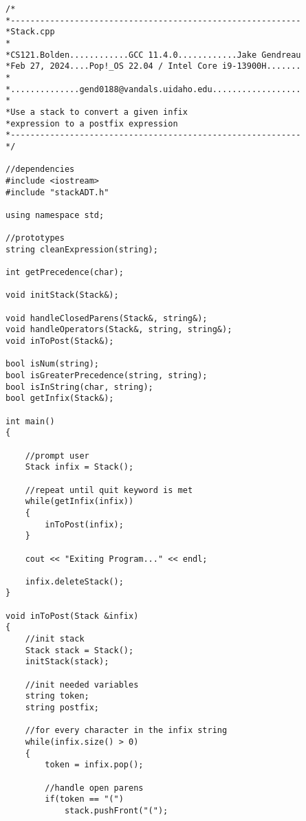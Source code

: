 
\begin{lstlisting}[style=cppstyle, caption={stack.cpp}]
/*
*-----------------------------------------------------------
*Stack.cpp
*
*CS121.Bolden............GCC 11.4.0............Jake Gendreau
*Feb 27, 2024....Pop!_OS 22.04 / Intel Core i9-13900H.......
*
*..............gend0188@vandals.uidaho.edu..................
*
*Use a stack to convert a given infix 
*expression to a postfix expression
*-----------------------------------------------------------
*/

//dependencies
#include <iostream>
#include "stackADT.h"

using namespace std;

//prototypes
string cleanExpression(string);

int getPrecedence(char);

void initStack(Stack&);

void handleClosedParens(Stack&, string&);
void handleOperators(Stack&, string, string&);
void inToPost(Stack&);

bool isNum(string);
bool isGreaterPrecedence(string, string);
bool isInString(char, string);
bool getInfix(Stack&);

int main()
{

    //prompt user
    Stack infix = Stack();
    
    //repeat until quit keyword is met
    while(getInfix(infix))
    {
        inToPost(infix);
    }

    cout << "Exiting Program..." << endl;

    infix.deleteStack();
}

void inToPost(Stack &infix)
{
    //init stack
    Stack stack = Stack();
    initStack(stack);

    //init needed variables
    string token;
    string postfix;

    //for every character in the infix string
    while(infix.size() > 0)
    {
        token = infix.pop();

        //handle open parens
        if(token == "(")
            stack.pushFront("(");


\end{lstlisting}
